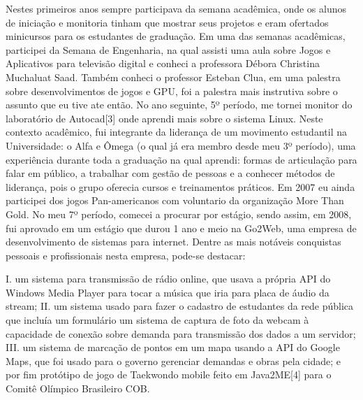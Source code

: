 \documentclass[10pt,a4paper,oneside]{book}
\begin{document}
Nestes primeiros anos sempre participava da semana acadêmica, onde os alunos de iniciação e monitoria tinham que mostrar seus projetos e eram ofertados minicursos para os estudantes de graduação. Em uma das semanas acadêmicas, participei da Semana de Engenharia, na qual assisti uma aula sobre Jogos e Aplicativos para televisão digital e conheci a professora Débora Christina Muchaluat Saad. Também conheci o professor Esteban Clua, em uma palestra sobre desenvolvimentos de jogos e GPU, foi a palestra mais instrutiva sobre o assunto que eu tive ate então. No ano seguinte, 5º período, me tornei monitor do laboratório de Autocad[3] onde aprendi mais sobre o sistema Linux.
Neste contexto acadêmico, fui integrante da liderança de um  movimento estudantil na Universidade: o Alfa e Ômega (o qual já era membro desde meu 3º período), uma experiência durante toda a graduação na qual aprendi:  formas de articulação para falar em público, a trabalhar com gestão de pessoas e a conhecer métodos de liderança, pois o grupo oferecia cursos e treinamentos práticos.  Em 2007 eu ainda participei dos jogos Pan-americanos com voluntario da organização More Than Gold.
No meu 7º período, comecei a procurar por estágio, sendo assim, em 2008, fui aprovado em um estágio que durou 1 ano e meio na Go2Web, uma empresa de desenvolvimento de sistemas para internet. Dentre as mais notáveis conquistas pessoais e profissionais nesta empresa, pode-se destacar:

I. um sistema para transmissão de rádio online, que usava a própria API do Windows Media Player para tocar a música que iria para placa de áudio da stream;
II. um sistema usado para fazer o cadastro de estudantes da rede pública que incluía um formulário um sistema de captura de foto da webcam à capacidade de conexão sobre demanda para transmissão dos dados a um servidor;
              III. um sistema de marcação de pontos em um mapa usando a API do Google Maps, que foi usado para o governo gerenciar demandas e obras pela cidade; e por fim protótipo de jogo de Taekwondo mobile feito em Java2ME[4] para o Comitê Olímpico Brasileiro COB.
\end{document}
